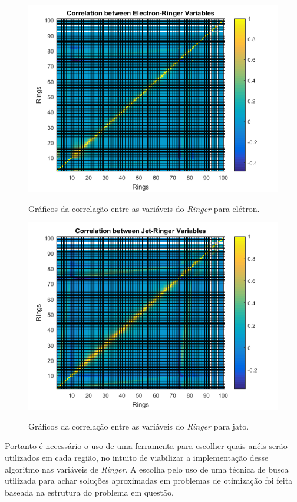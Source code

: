 \begin{figure}[H]
	\centering
	\includegraphics[width=12cm]{./textuais/algoritmo/figuras/plotCorrElectron.png}\\
	\caption{Gráficos da correlação entre as variáveis do \textit{Ringer} para elétron.}
	\label{fig:9T24}
\end{figure}

\begin{figure}[H]
	\centering
    \includegraphics[width=12cm]{./textuais/algoritmo/figuras/plotCorrJet.png}\\
	\caption{Gráficos da correlação entre as variáveis do \textit{Ringer} para jato.}
	\label{fig:9T25}
\end{figure}

Portanto é necessário o uso de uma ferramenta para escolher quais anéis serão utilizados em cada região, no intuito de viabilizar a implementação desse algoritmo nas variáveis de \textit{Ringer}. A escolha pelo uso de uma técnica de busca utilizada para achar soluções aproximadas em problemas de otimização foi feita baseada na estrutura do problema em questão.


